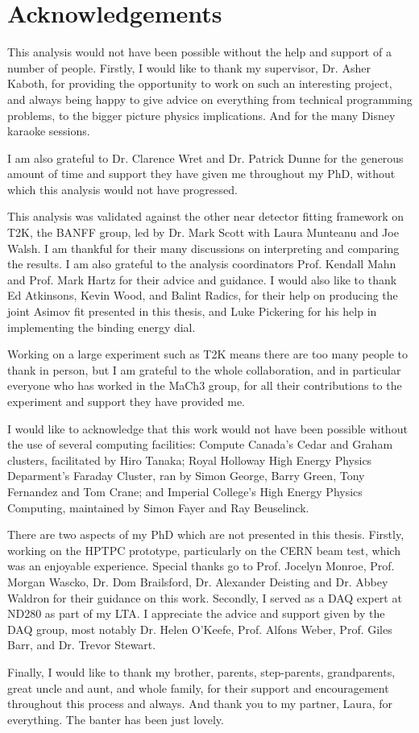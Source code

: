 \chapter*{Acknowledgements}

This analysis would not have been possible without the help and support of a number of people. Firstly, I would like to thank my supervisor, Dr. Asher Kaboth, for providing the opportunity to work on such an interesting project, and always being happy to give advice on everything from technical programming problems, to the bigger picture physics implications. And for the many Disney karaoke sessions.

I am also grateful to Dr. Clarence Wret and Dr. Patrick Dunne for the generous amount of time and support they have given me throughout my PhD, without which this analysis would not have progressed.

This analysis was validated against the other near detector fitting framework on T2K, the BANFF group, led by Dr. Mark Scott with Laura Munteanu and Joe Walsh. I am thankful for their many discussions on interpreting and comparing the results. I am also grateful to the analysis coordinators Prof. Kendall Mahn and Prof. Mark Hartz for their advice and guidance. I would also like to thank Ed Atkinsons, Kevin Wood, and Balint Radics, for their help on producing the joint Asimov fit presented in this thesis, and Luke Pickering for his help in implementing the binding energy dial. 

Working on a large experiment such as T2K means there are too many people to thank in person, but I am grateful to the whole collaboration, and in particular everyone who has worked in the MaCh3 group, for all their contributions to the experiment and support they have provided me.

I would like to acknowledge that this work would not have been possible without the use of several computing facilities: Compute Canada's Cedar and Graham clusters, facilitated by Hiro Tanaka; Royal Holloway High Energy Physics Deparment's Faraday Cluster, ran by Simon George, Barry Green, Tony Fernandez and Tom Crane; and Imperial College's High Energy Physics Computing, maintained by Simon Fayer and Ray Beuselinck.

There are two aspects of my PhD which are not presented in this thesis. Firstly, working on the HPTPC prototype, particularly on the CERN beam test, which was an enjoyable experience. Special thanks go to Prof. Jocelyn Monroe, Prof. Morgan Wascko, Dr. Dom Brailsford, Dr. Alexander Deisting and Dr. Abbey Waldron for their guidance on this work. Secondly, I served as a DAQ expert at ND280 as part of my LTA. I appreciate the advice and support given by the DAQ group, most notably Dr. Helen O'Keefe, Prof. Alfons Weber, Prof. Giles Barr, and Dr. Trevor Stewart.

Finally, I would like to thank my brother, parents, step-parents, grandparents, great uncle and aunt, and whole family, for their support and encouragement throughout this process and always. And thank you to my partner, Laura, for everything. The banter has been just lovely.

\newpage